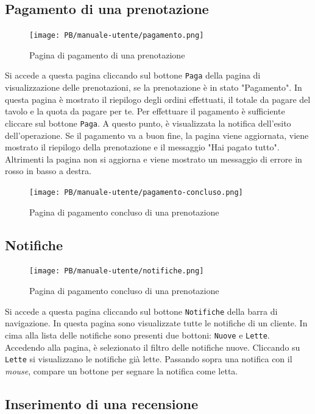 \subsection{Pagamento di una prenotazione}
\begin{figure}[htbp]
    \centering
	\texttt{[image: PB/manuale-utente/pagamento.png]}
    \caption{Pagina di pagamento di una prenotazione}
\end{figure}

Si accede a questa pagina cliccando sul bottone \texttt{Paga} della pagina di
visualizzazione delle prenotazioni, se la prenotazione è in stato "Pagamento".
In questa pagina è mostrato il riepilogo degli ordini effettuati, il totale da
pagare del tavolo e la quota da pagare per te. Per effettuare il pagamento è
sufficiente cliccare sul bottone \texttt{Paga}. A questo punto, è visualizzata
la notifica dell'esito dell'operazione. Se il pagamento va a buon fine, la
pagina viene aggiornata, viene mostrato il riepilogo della prenotazione e il
messaggio "Hai pagato tutto". Altrimenti la pagina non si aggiorna e viene
mostrato un messaggio di errore in rosso in basso a destra.

\begin{figure}[htbp]
    \centering
	\texttt{[image: PB/manuale-utente/pagamento-concluso.png]}
    \caption{Pagina di pagamento concluso di una prenotazione}
\end{figure}

\subsection{Notifiche}

\begin{figure}[htbp]
    \centering
	\texttt{[image: PB/manuale-utente/notifiche.png]}
    \caption{Pagina di pagamento concluso di una prenotazione}
\end{figure}

Si accede a questa pagina cliccando sul bottone \texttt{Notifiche} della barra di
navigazione. In questa pagina sono visualizzate tutte le notifiche di un
cliente. In cima alla lista delle notifiche sono presenti due bottoni:
\texttt{Nuove} e \texttt{Lette}. Accedendo alla pagina, è selezionato il filtro
delle notifiche nuove. Cliccando su \texttt{Lette} si visualizzano le notifiche
già lette. Passando sopra una notifica con il \textit{mouse}, compare un bottone per
segnare la notifica come letta.

\subsection{Inserimento di una recensione}

